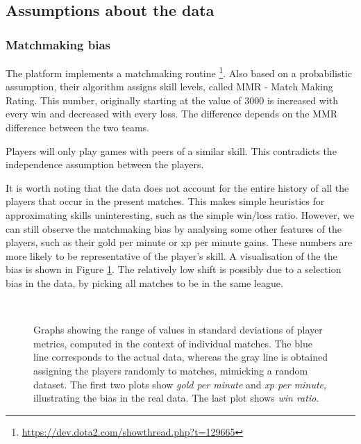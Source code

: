\documentclass[10pt,a4]{article}
\begin{document}
\subsection{Assumptions about the data}

\subsubsection{Matchmaking bias}
The platform implements a matchmaking routine \footnote{\url{https://dev.dota2.com/showthread.php?t=129665}}.
Also based on a probabilistic assumption, their algorithm assigns skill levels,
called MMR - Match Making Rating. This number, originally starting at the value of 
3000 is increased with every win and decreased with every loss. The difference depends
on the MMR difference between the two teams. 

Players will only play games with peers of a similar skill. This contradicts the 
independence assumption between the players. 

It is worth noting that the data does not account for the entire history of all 
the players that occur in the present matches. This makes simple heuristics for 
approximating skills uninteresting, such as the simple win/loss ratio. However, 
we can still observe the matchmaking bias by analysing some other features of the 
players, such as their gold per minute or xp per minute gains. These numbers are 
more likely to be representative of the player's skill. A visualisation of the  
the bias is shown in Figure \ref{fig:differences}. The relatively low shift 
is possibly due to a selection bias in the data, by picking all matches to be in 
the same league.

\begin{figure}[h!]
  \centering
  \mbox{
      \quad
  }
  \mbox{
  }
  \caption{Graphs showing the range of values in standard deviations of player
  metrics, computed in the context of individual matches. 
  The blue line corresponds to the actual data, whereas the gray line is obtained 
  assigning the players randomly to matches, mimicking a random dataset.
  The first two plots show \emph{gold per minute} and \emph{xp per minute}, 
  illustrating the bias in the real data. The last plot shows \emph{win ratio}.}
  \label{fig:differences}
\end{figure}
\end{document}
